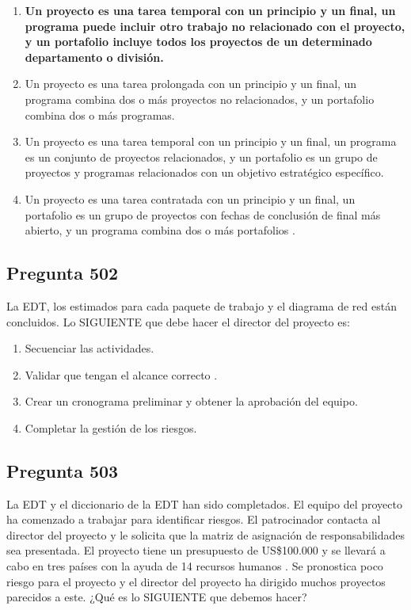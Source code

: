 \documentclass[11pt,a4paper]{article}
\begin{document}
\begin{enumerate}[label=\alph*)]
  \item \textbf{Un proyecto es una tarea temporal con un principio y un final, un programa puede incluir otro trabajo no relacionado con el proyecto, y un portafolio incluye todos los proyectos de un determinado departamento o división.}
  \item Un proyecto es una tarea prolongada con un principio y un final, un programa combina dos o más proyectos no relacionados, y un portafolio combina dos o más programas.
  \item Un proyecto es una tarea temporal con un principio y un final, un programa es un conjunto de proyectos relacionados, y un portafolio es un grupo de proyectos y programas relacionados con un objetivo estratégico específico.
  \item Un proyecto es una tarea contratada con un principio y un final, un portafolio es un grupo de proyectos con fechas de conclusión de final más abierto, y un programa combina dos o más portafolios .
\end{enumerate}

\subsection*{Pregunta 502}
La EDT, los estimados para cada paquete de trabajo y el diagrama de red están concluidos. Lo SIGUIENTE que debe hacer el director del proyecto es:

\begin{enumerate}[label=\alph*)]
  \item Secuenciar las actividades.
  \item Validar que tengan el alcance correcto .
  \item Crear un cronograma preliminar y obtener la aprobación del equipo.
  \item Completar la gestión de los riesgos.
\end{enumerate}

\subsection*{Pregunta 503}
La EDT y el diccionario de la EDT han sido completados. El equipo del proyecto ha comenzado a trabajar para identificar riesgos. El patrocinador contacta al director del proyecto y le solicita que la matriz de asignación de responsabilidades sea presentada. El proyecto tiene un presupuesto de US\$100.000 y se llevará a cabo en tres países con la ayuda de 14 recursos humanos . Se pronostica poco riesgo para el proyecto y el director del proyecto ha dirigido muchos proyectos parecidos a este. ¿Qué es lo SIGUIENTE que debemos hacer?
\end{document}
